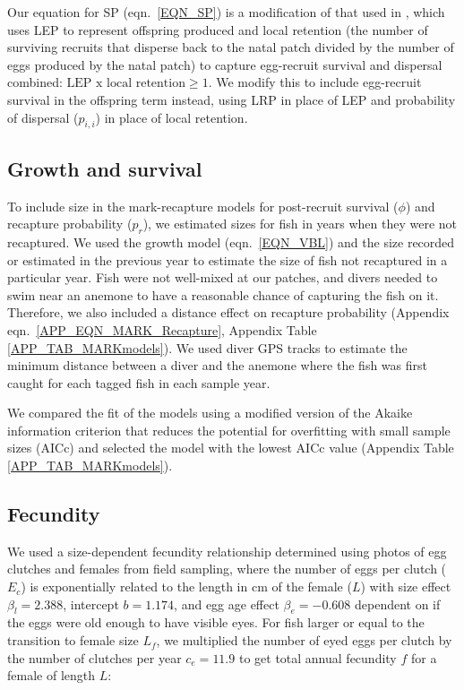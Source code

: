 \documentclass[12pt, oneside]{article}   	%
\begin{document}
Our equation for SP (eqn.\ \ref{EQN_SP}) is a modification of that used in \cite{burgess2014beyond}, which uses LEP to represent offspring produced and local retention (the number of surviving recruits that disperse back to the natal patch divided by the number of eggs produced by the natal patch) to capture egg-recruit survival and dispersal combined: $\text{LEP } \text{x } \text{local retention} \geq 1$. We modify this to include egg-recruit survival in the offspring term instead, using LRP in place of LEP and probability of dispersal ($p_{i,i}$) in place of local retention.

\subsection{Growth and survival} \label{APP_SEC_METHODS_Growth_and_survival}

To include size in the mark-recapture models for post-recruit survival ($\phi$) and recapture probability ($p_r$), we estimated sizes for fish in years when they were not recaptured. We used the growth model (eqn.\ \ref{EQN_VBL}) and the size recorded or estimated in the previous year to estimate the size of fish not recaptured in a particular year. Fish were not well-mixed at our patches, and divers needed to swim near an anemone to have a reasonable chance of capturing the fish on it. Therefore, we also included a distance effect on recapture probability (Appendix eqn.\ \ref{APP_EQN_MARK_Recapture}, Appendix Table \ref{APP_TAB_MARKmodels}). We used diver GPS tracks to estimate the minimum distance between a diver and the anemone where the fish was first caught for each tagged fish in each sample year.

We compared the fit of the models using a modified version of the Akaike information criterion that reduces the potential for overfitting with small sample sizes (AICc) and selected the model with the lowest AICc value (Appendix Table \ref{APP_TAB_MARKmodels}).

\subsection{Fecundity} \label{APP_SEC_METHODS_Fecundity}

We used a size-dependent fecundity relationship determined using photos of egg clutches and females from field sampling, where the number of eggs per clutch ($E_c$) is exponentially related to the length in cm of the female ($L$) with size effect $\beta_l = 2.388$, intercept $b = 1.174$, and egg age effect $\beta_e = -0.608$ dependent on if the eggs were old enough to have visible eyes. For fish larger or equal to the transition to female size $L_f$, we multiplied the number of eyed eggs per clutch by the number of clutches per year $c_e = 11.9$ \citep[estimate from][]{holtswarth2017fecundity} to get total annual fecundity $f$ for a female of length $L$:
\end{document}
